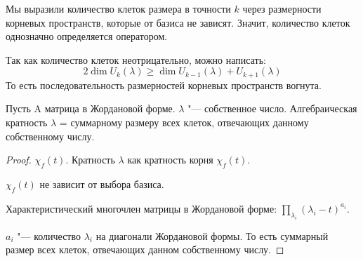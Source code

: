 \begin{conseq}
	Мы выразили количество клеток размера в точности $k$ через размерности корневых пространств,
	которые от базиса не зависят.
	Значит, количество клеток однозначно определяется оператором.
\end{conseq}
\begin{conseq}
	Так как количество клеток неотрицательно, можно написать:
	\[ 2\dim U_k(\lambda) \ge \dim U_{k-1}(\lambda) + U_{k+1}(\lambda) \]
	То есть последовательность размерностей корневых пространств вогнута.
\end{conseq}
\begin{lemma}{}
Пусть A матрица в Жордановой форме. $\lambda$ "--- собственное число. Алгебраическая кратность 
$\lambda$ = суммарному размеру всех клеток, отвечающих данному собственному числу. 
\end{lemma}
\begin{proof}
$\chi_f(t)$. Кратность $\lambda$ как кратность корня $\chi_f(t)$.

$\chi_f(t)$ не зависит от выбора базиса. 

Характеристический многочлен матрицы в Жордановой форме: $\prod_{\lambda_i}(\lambda_i - t)^{a_i}$.

$a_i$ "--- количество $\lambda_i$ на диагонали Жордановой формы. То есть суммарный размер
всех клеток, отвечающих данном собственному числу.
\end{proof}